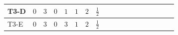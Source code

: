 \documentclass[8pt]{article}
\begin{document}
\begin{landscape}
\begin{longtable}{@{}llcccccc >{\raggedright\arraybackslash}p{0.21\linewidth} >{\raggedright\arraybackslash}p{0.21\linewidth}@{}}
\midrule
T3-D & $0$ & $3$ & $0$ & $1$ & $1$ & $2$ & $\frac{1}{2}$ & \scriptsize\adjustbox{max width=\linewidth}{$\begin{gathered} 6 C_{5} Y_d Y_d^\dagger\end{gathered}$} & \scriptsize\adjustbox{max width=\linewidth}{$\begin{gathered} 6 C_{5} Y_u Y_u^\dagger\end{gathered}$} \\
\midrule
T3-E & $0$ & $3$ & $0$ & $3$ & $1$ & $2$ & $\frac{1}{2}$ & \scriptsize\adjustbox{max width=\linewidth}{$\begin{gathered} 6 C_{5} Y_d Y_d^\dagger\end{gathered}$} & \scriptsize\adjustbox{max width=\linewidth}{$\begin{gathered} 6 C_{5} Y_u Y_u^\dagger\end{gathered}$} \\
\midrule
\bottomrule
\end{longtable}
\end{landscape}
\end{document}
